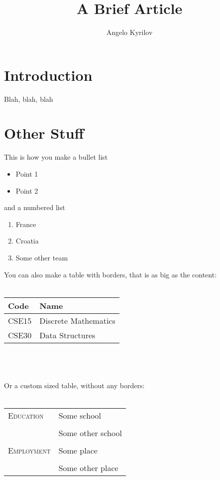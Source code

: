 \documentclass[11pt]{article}
\title{A Brief Article}
\author{Angelo Kyrilov}
\begin{document}
\maketitle

\section{Introduction}
Blah, blah, blah

\section{Other Stuff}

This is how you make a bullet list

\begin{itemize}
\item Point 1
\item Point 2
\end{itemize}

\noindent
and a numbered list

\begin{enumerate}
\item France
\item Croatia
\item Some other team
\end{enumerate}

\noindent
You can also make a table with borders, that is as big as the content:
\\\\
\begin{tabular}{|l|l|}
\hline
\textbf{Code} & \textbf{Name} \\
\hline
\hline
CSE15 & Discrete Mathematics\\
CSE30 & Data Structures \\
\hline
\end{tabular}
\\\\\\
\noindent
Or a custom sized table, without any borders:
\\\\
\begin{tabular}{p{2in} p{4.15in}}
    \textsc{Education} &  Some school\\\\
    & Some other school\\\\
    \textsc{Employment} & Some place\\\\
    & Some other place
\end{tabular}
\end{document}
